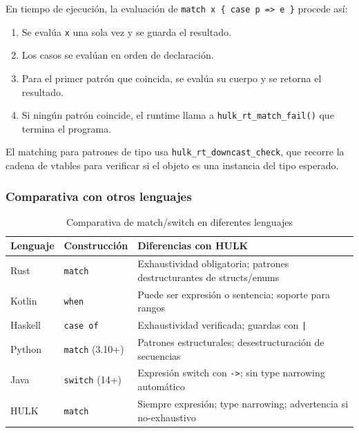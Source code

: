 \documentclass[12pt, a4paper]{article}
\begin{document}
En tiempo de ejecución, la evaluación de \texttt{match x \{ case p => e \}}
procede así:

\begin{enumerate}[leftmargin=*, label=\arabic*.]
    \item Se evalúa \texttt{x} una sola vez y se guarda el resultado.
    \item Los casos se evalúan en orden de declaración.
    \item Para el primer patrón que coincida, se evalúa su cuerpo y se retorna
          el resultado.
    \item Si ningún patrón coincide, el runtime llama a
          \texttt{hulk\_rt\_match\_fail()} que termina el programa.
\end{enumerate}

El matching para patrones de tipo usa \texttt{hulk\_rt\_downcast\_check},
que recorre la cadena de vtables para verificar si el objeto es una instancia
del tipo esperado.

\subsubsection{Comparativa con otros lenguajes}

\begin{table}[h!]
\centering
\caption{Comparativa de match/switch en diferentes lenguajes}
\label{tab:match-compare}
\begin{tabularx}{\textwidth}{@{}lXX@{}}
\toprule
\textbf{Lenguaje} & \textbf{Construcción} & \textbf{Diferencias con HULK} \\
\midrule
Rust~\cite{klabnik2019} & \texttt{match} & Exhaustividad obligatoria; patrones destructurantes de structs/enums \\
Kotlin~\cite{jemerov2017} & \texttt{when} & Puede ser expresión o sentencia; soporte para rangos \\
Haskell~\cite{marlow2010} & \texttt{case of} & Exhaustividad verificada; guardas con \texttt{|} \\
Python~\cite{bucher2020} & \texttt{match} (3.10+) & Patrones estructurales; desestructuración de secuencias \\
Java~\cite{bierman2019} & \texttt{switch} (14+) & Expresión switch con \texttt{->}; sin type narrowing automático \\
HULK & \texttt{match} & Siempre expresión; type narrowing; advertencia si no-exhaustivo \\
\bottomrule
\end{tabularx}
\end{table}
\end{document}
